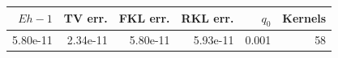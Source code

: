 \begin{tabular}{rrrrrr}
\toprule
$E h-1$ & TV err. & FKL err. & RKL err. & $q_0$ & Kernels \\
\midrule
5.80e-11 & 2.34e-11 & 5.80e-11 & 5.93e-11 & 0.001 & 58 \\
\bottomrule
\end{tabular}
